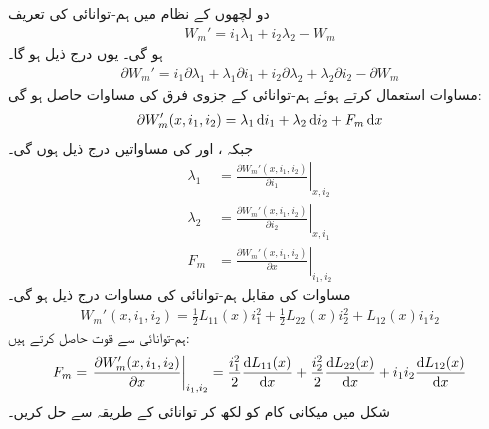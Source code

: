 دو لچھوں کے نظام میں  ہم-توانائی کی تعریف
\begin{align*}
W_m'=i_1\lambda_1+i_2\lambda_2-W_m
\end{align*}
ہو گی۔ یوں درج ذیل ہو گا۔
\begin{align*}
\partial W_m'=i_1\partial \lambda_1+\lambda_1\partial i_1+i_2\partial \lambda_2+\lambda_2\partial i_2-\partial W_m
\end{align*}
مساوات  استعمال کرتے ہوئے ہم-توانائی کے جزوی فرق کی مساوات حاصل ہو گی:
\begin{align}
\partial W_m'(x,i_1,i_2)=\lambda_1 \dif i_1+\lambda_2 \dif i_2+F_m \dif x
\end{align}
جبکہ ،  اور  کی مساواتیں درج ذیل ہوں گی۔
\begin{align}
\lambda_1&=\left. \frac{\partial W_m'(x,i_1,i_2)}{\partial i_1} \right|_{x,i_2}\\
\lambda_2&=\left. \frac{\partial W_m'(x,i_1,i_2)}{\partial i_2} \right|_{x,i_1}\\
F_m&=\left. \frac{\partial W_m'(x,i_1,i_2)}{\partial x} \right|_{i_1,i_2}
\end{align}
مساوات   کی مقابل ہم-توانائی کی مساوات درج ذیل ہو گی۔
\begin{align}
W_m'(x,i_1,i_2)=\frac{1}{2}L_{11}(x) i_1^2+\frac{1}{2} L_{22}(x) i_2^2+L_{12}(x)i_1 i_2
\end{align}
ہم-توانائی سے قوت حاصل کرتے ہیں:
\begin{align}
F_m=\left. \frac{\partial W_m'(x,i_1,i_2)}{\partial x} \right|_{i_1,i_2}=\frac{i_1^2}{2} \frac{\dif L_{11}(x)}{\dif x}+\frac{i_2^2}{2}\frac{\dif L_{22}(x)}{\dif x}+i_1 i_2 \frac{\dif L_{12}(x)}{\dif x}
\end{align}
%
شکل   میں میکانی کام کو   لکھ کر توانائی کے طریقہ سے حل کریں۔

